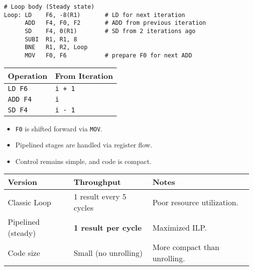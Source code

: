 \begin{examplebox}
\begin{lstlisting}[language=riscv]
# Loop body (Steady state)
Loop: LD    F6, -8(R1)       # LD for next iteration
      ADD   F4, F0, F2       # ADD from previous iteration
      SD    F4, 0(R1)        # SD from 2 iterations ago
      SUBI  R1, R1, 8
      BNE   R1, R2, Loop
      MOV   F0, F6           # prepare F0 for next ADD\end{lstlisting}
    \begin{center}
        \begin{tabular}{@{} l l @{}}
            \toprule
            Operation & From Iteration \\
            \midrule
            \texttt{LD F6}  & \texttt{i + 1} \\ [.3em]
            \texttt{ADD F4} & \texttt{i}     \\ [.3em]
            \texttt{SD F4}  & \texttt{i - 1} \\
            \bottomrule
        \end{tabular}
    \end{center}
    \begin{itemize}
        \item \texttt{F0} is shifted forward via \texttt{MOV}.
        \item Pipelined stages are handled via register flow.
        \item Control remains simple, and code is compact.
    \end{itemize}
    \begin{center}
        \begin{adjustbox}{width={\textwidth},totalheight={\textheight},keepaspectratio}
            \begin{tabular}{@{} l l l @{}}
                \toprule
                Version & Throughput & Notes \\
                \midrule
                Classic Loop        & 1 result every 5 cycles       & Poor resource utilization. \\ [.3em]
                Pipelined (steady)  & \textbf{1 result per cycle}   & Maximized ILP. \\ [.3em]
                Code size           & Small (no unrolling)          & More compact than unrolling. \\
                \bottomrule
            \end{tabular}
        \end{adjustbox}
    \end{center}
\end{examplebox}